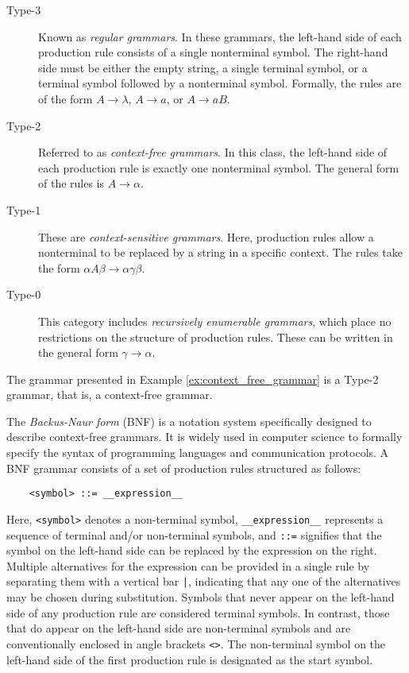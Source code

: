 \begin{description}
\item[Type-3] Known as \emph{regular grammars}. In these grammars, the left-hand side of each production rule consists of a single nonterminal symbol. The right-hand side must be either the empty string, a single terminal symbol, or a terminal symbol followed by a nonterminal symbol. Formally, the rules are of the form $A \rightarrow \lambda$, $A \rightarrow a$, or $A \rightarrow aB$.

\item[Type-2] Referred to as \emph{context-free grammars}. In this class, the left-hand side of each production rule is exactly one nonterminal symbol. The general form of the rules is $A \rightarrow \alpha$.

\item[Type-1] These are \emph{context-sensitive grammars}. Here, production rules allow a nonterminal to be replaced by a string in a specific context. The rules take the form $\alpha A \beta \rightarrow \alpha \gamma \beta$.

\item[Type-0] This category includes \emph{recursively enumerable grammars}, which place no restrictions on the structure of production rules. These can be written in the general form $\gamma \rightarrow \alpha$.
\end{description}

\begin{example}
The grammar presented in Example \ref{ex:context_free_grammar} is a Type-2 grammar, that is, a context-free grammar.
\end{example}

The \emph{Backus-Naur form} (BNF) is a notation system specifically designed to describe context-free grammars. It is widely used in computer science to formally specify the syntax of programming languages and communication protocols. A BNF grammar consists of a set of production rules structured as follows:

\begin{verbatim}
    <symbol> ::= __expression__
\end{verbatim}

Here, \texttt{<symbol>} denotes a non-terminal symbol, \texttt{\_\_expression\_\_} represents a sequence of terminal and/or non-terminal symbols, and \texttt{::=} signifies that the symbol on the left-hand side can be replaced by the expression on the right. Multiple alternatives for the expression can be provided in a single rule by separating them with a vertical bar \texttt{|}, indicating that any one of the alternatives may be chosen during substitution. Symbols that never appear on the left-hand side of any production rule are considered terminal symbols. In contrast, those that do appear on the left-hand side are non-terminal symbols and are conventionally enclosed in angle brackets \texttt{<>}. The non-terminal symbol on the left-hand side of the first production rule is designated as the start symbol.

